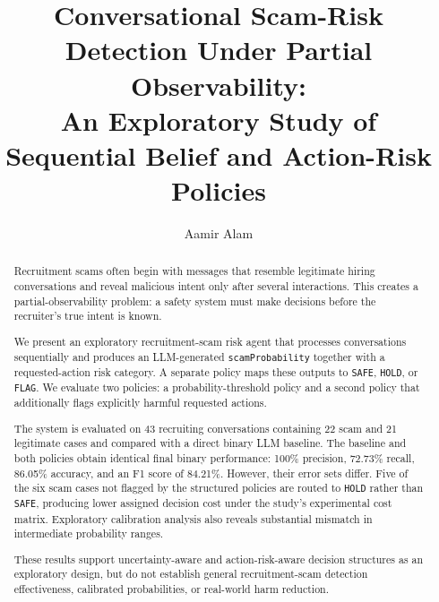 \documentclass{article}
\title{Conversational Scam-Risk Detection Under Partial Observability:\\
An Exploratory Study of Sequential Belief and Action-Risk Policies}
\author{Aamir Alam}
\newif\ifofficialijcai
\begin{document}
\maketitle

\begin{abstract}
Recruitment scams often begin with messages that resemble legitimate hiring conversations and reveal malicious intent only after several interactions. This creates a partial-observability problem: a safety system must make decisions before the recruiter's true intent is known.

We present an exploratory recruitment-scam risk agent that processes conversations sequentially and produces an LLM-generated \texttt{scamProbability} together with a requested-action risk category. A separate policy maps these outputs to \texttt{SAFE}, \texttt{HOLD}, or \texttt{FLAG}. We evaluate two policies: a probability-threshold policy and a second policy that additionally flags explicitly harmful requested actions.

The system is evaluated on 43 recruiting conversations containing 22 scam and 21 legitimate cases and compared with a direct binary LLM baseline. The baseline and both policies obtain identical final binary performance: 100\% precision, 72.73\% recall, 86.05\% accuracy, and an F1 score of 84.21\%. However, their error sets differ. Five of the six scam cases not flagged by the structured policies are routed to \texttt{HOLD} rather than \texttt{SAFE}, producing lower assigned decision cost under the study's experimental cost matrix. Exploratory calibration analysis also reveals substantial mismatch in intermediate probability ranges.

These results support uncertainty-aware and action-risk-aware decision structures as an exploratory design, but do not establish general recruitment-scam detection effectiveness, calibrated probabilities, or real-world harm reduction.
\end{abstract}
\ifofficialijcai\else
\end{document}
